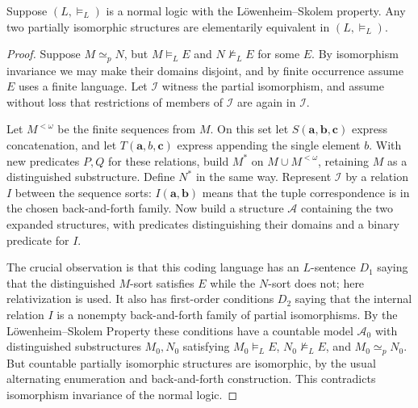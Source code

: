 \begin{theorem}
Suppose $(L,\models_L)$ is a normal logic with the L\"owenheim--Skolem
property. Any two partially isomorphic structures are elementarily
equivalent in $(L,\models_L)$.
\end{theorem}
\begin{proof}
Suppose $M\simeq_pN$, but $M\models_LE$ and $N\not\models_LE$ for some
$E$. By isomorphism invariance we may make their domains disjoint, and
by finite occurrence assume $E$ uses a finite language.
Let $\mathcal I$ witness the partial isomorphism, and assume without loss
that restrictions of members of $\mathcal I$ are again in $\mathcal I$.

Let $M^{<\omega}$ be the finite sequences from $M$. On this set let
$S(\mathbf a,\mathbf b,\mathbf c)$ express concatenation, and let
$T(\mathbf a,b,\mathbf c)$ express appending the single element $b$.
With new predicates $P,Q$ for these relations, build $M^*$ on
$M\cup M^{<\omega}$, retaining $M$ as a distinguished substructure.
Define $N^*$ in the same way.
Represent $\mathcal I$ by a relation $I$ between the sequence sorts:
$I(\mathbf a,\mathbf b)$ means that the tuple correspondence is in the
chosen back-and-forth family.
Now build a structure $\mathcal A$ containing the two expanded structures,
with predicates distinguishing their domains and a binary predicate for $I$.

\begin{center}
\end{center}
The crucial observation is that this coding language has an $L$-sentence
$D_1$ saying that the distinguished $M$-sort satisfies $E$ while the
$N$-sort does not; here relativization is used. It also has first-order
conditions $D_2$ saying that the internal relation $I$ is a nonempty
back-and-forth family of partial isomorphisms. By the
L\"owenheim--Skolem Property these conditions have a countable model
$\mathcal A_0$ with distinguished substructures $M_0,N_0$ satisfying
$M_0\models_LE$, $N_0\not\models_LE$, and $M_0\simeq_pN_0$.
But countable partially isomorphic structures are isomorphic, by the
usual alternating enumeration and back-and-forth construction.
This contradicts isomorphism invariance of the normal logic.
\end{proof}

